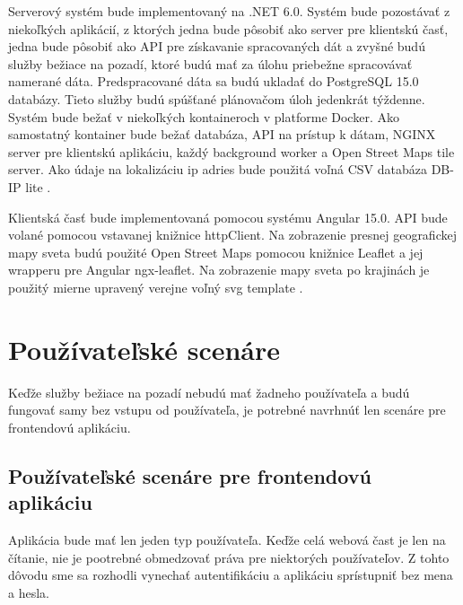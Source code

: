 Serverový systém bude implementovaný na .NET 6.0. Systém bude pozostávať z niekoľkých aplikácií, z ktorých jedna bude pôsobiť ako 
server pre klientskú časť, jedna bude pôsobiť ako API pre získavanie spracovaných dát a zvyšné budú služby bežiace na pozadí, ktoré budú mať za úlohu
priebežne spracovávať namerané dáta. Predspracované dáta sa budú ukladať do PostgreSQL 15.0 databázy. Tieto služby budú spúšťané plánovačom úloh
jedenkrát týždenne. Systém bude bežať v niekoľkých kontaineroch v platforme Docker. Ako samostatný kontainer bude bežať databáza, API na prístup k 
dátam, NGINX server pre klientskú aplikáciu, každý background worker a Open Street Maps tile server. Ako údaje na lokalizáciu ip adries bude 
použitá voľná CSV databáza DB-IP lite \cite{ip_city_db}.

Klientská časť bude implementovaná pomocou systému Angular 15.0. API bude volané pomocou vstavanej knižnice httpClient. Na zobrazenie 
presnej geografickej mapy sveta budú použité Open Street Maps pomocou knižnice Leaflet a jej wrapperu pre Angular ngx-leaflet. Na zobrazenie 
mapy sveta po krajinách je použitý mierne upravený verejne voľný svg template \cite{svg_mapa}.

\section{Používateľské scenáre}
Keďže služby bežiace na pozadí nebudú mať žadneho používateľa a budú fungovať samy bez vstupu od používateľa, je potrebné navrhnúť len scenáre 
pre frontendovú aplikáciu.

\subsection{Používateľské scenáre pre frontendovú aplikáciu}
\label{scenare}
Aplikácia bude mať len jeden typ používateľa. Keďže celá webová čast je len na čítanie, nie je pootrebné obmedzovať práva pre niektorých používateľov. 
Z tohto dôvodu sme sa rozhodli vynechať autentifikáciu a aplikáciu sprístupniť bez mena a hesla.

